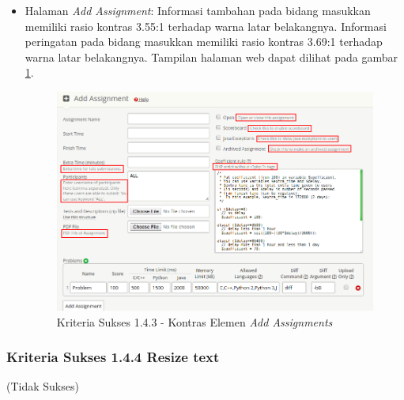 \documentclass[a4paper,twoside]{article}
\begin{document}
\begin{enumerate}
\begin{itemize}
			\item Halaman \textit{Add Assignment}: Informasi tambahan pada bidang masukkan memiliki rasio kontras 3.55:1 terhadap warna latar belakangnya. Informasi peringatan pada bidang masukkan memiliki rasio kontras 3.69:1 terhadap warna latar belakangnya. Tampilan halaman web dapat dilihat pada gambar \ref{fig:kepatuhan_1_4_3_add_assignment}.
			\begin{figure}[H]
				\centering  
				\includegraphics[scale=0.5]{kepatuhan_1_4_3_add_assignment}  
				\caption[Kriteria Sukses 1.4.3 - Kontras Elemen \textit{Add Assignments}]{Kriteria Sukses 1.4.3 - Kontras Elemen \textit{Add Assignments}} 
				\label{fig:kepatuhan_1_4_3_add_assignment} 
			\end{figure}
			
		\end{itemize}
		
		\subsubsection*{Kriteria Sukses 1.4.4 Resize text}
		\label{subsubsec:kepatuhan_kriteria_1.4.4}
		(Tidak Sukses) \\
		

\end{enumerate}
\end{document}

